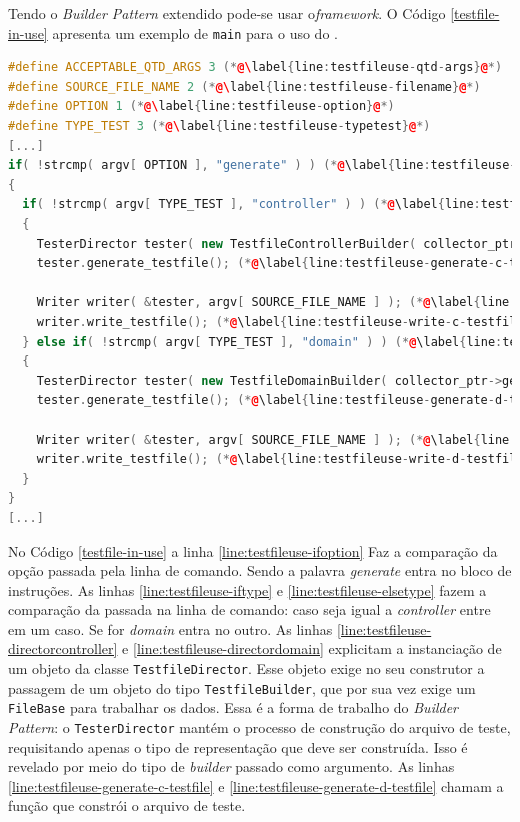 Tendo o \textit{Builder Pattern} extendido pode-se usar o\textit{framework}.
O Código \ref{testfile-in-use} apresenta um exemplo de \lstinline|main| para
o uso do \Scarefault.

\begin{lstlisting}[language=C++, label=testfile-in-use, caption=Agente testador sendo usado na função \lstinline|main|]
#define ACCEPTABLE_QTD_ARGS 3 (*@\label{line:testfileuse-qtd-args}@*)
#define SOURCE_FILE_NAME 2 (*@\label{line:testfileuse-filename}@*)
#define OPTION 1 (*@\label{line:testfileuse-option}@*)
#define TYPE_TEST 3 (*@\label{line:testfileuse-typetest}@*)
[...]
if( !strcmp( argv[ OPTION ], "generate" ) ) (*@\label{line:testfileuse-ifoption}@*)
{
  if( !strcmp( argv[ TYPE_TEST ], "controller" ) ) (*@\label{line:testfileuse-iftype}@*)
  {
    TesterDirector tester( new TestfileControllerBuilder( collector_ptr->get_data() ) ); (*@\label{line:testfileuse-directorcontroller}@*)
    tester.generate_testfile(); (*@\label{line:testfileuse-generate-c-testfile}@*)

    Writer writer( &tester, argv[ SOURCE_FILE_NAME ] ); (*@\label{line:testfileuse-writer-c}@*)
    writer.write_testfile(); (*@\label{line:testfileuse-write-c-testfile}@*)
  } else if( !strcmp( argv[ TYPE_TEST ], "domain" ) ) (*@\label{line:testfileuse-elsetype}@*)
  {
    TesterDirector tester( new TestfileDomainBuilder( collector_ptr->get_data() ) ); (*@\label{line:testfileuse-directordomain}@*)
    tester.generate_testfile(); (*@\label{line:testfileuse-generate-d-testfile}@*)

    Writer writer( &tester, argv[ SOURCE_FILE_NAME ] ); (*@\label{line:testfileuse-writer-d}@*)
    writer.write_testfile(); (*@\label{line:testfileuse-write-d-testfile}@*)
  }
}
[...]
\end{lstlisting}

No Código \ref{testfile-in-use} a linha \ref{line:testfileuse-ifoption}
Faz a comparação da opção passada pela linha de comando. Sendo a palavra
\textit{generate} entra no bloco de instruções. As linhas
\ref{line:testfileuse-iftype} e \ref{line:testfileuse-elsetype} fazem a
comparação da \str passada na linha de comando: caso seja igual a
\textit{controller} entre em um caso. Se for \textit{domain} entra no
outro. As linhas \ref{line:testfileuse-directorcontroller} e
\ref{line:testfileuse-directordomain} explicitam a instanciação de um
objeto da classe \lstinline|TestfileDirector|. Esse objeto exige no
seu construtor a passagem de um objeto do tipo \lstinline|TestfileBuilder|,
que por sua vez exige um \lstinline|FileBase| para trabalhar os dados. Essa
é a forma de trabalho do \textit{Builder Pattern}: o \lstinline|TesterDirector|
mantém o processo de construção do arquivo de teste, requisitando apenas o
tipo de representação que deve ser construída. Isso é revelado por meio do
tipo de \textit{builder} passado como argumento. As linhas
\ref{line:testfileuse-generate-c-testfile} e \ref{line:testfileuse-generate-d-testfile}
chamam a função que constrói o arquivo de teste.


